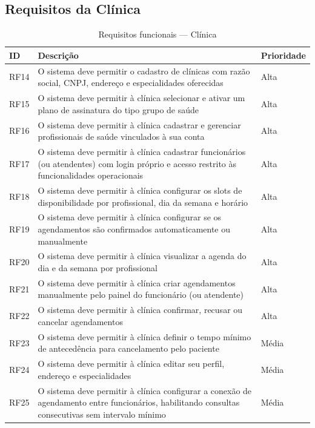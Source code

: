 \subsection{Requisitos da Clínica}
\label{subsec:clinic-requirements}

\begin{table}[H]
  \centering
  \caption{Requisitos funcionais --- Clínica}
  \label{tab:clinic-requirements}
  \begin{tabular}{p{1.2cm}p{7cm}p{2cm}}
    \toprule
    \textbf{ID} &
    \textbf{Descrição} &
    \textbf{Prioridade} \\
    \midrule
    RF14 & O sistema deve permitir o cadastro de
           clínicas com razão social, CNPJ,
           endereço e especialidades oferecidas
         & Alta \\
    RF15 & O sistema deve permitir à clínica
           selecionar e ativar um plano de
           assinatura do tipo grupo de saúde
         & Alta \\
    RF16 & O sistema deve permitir à clínica
           cadastrar e gerenciar profissionais
           de saúde vinculados à sua conta
         & Alta \\
    RF17 & O sistema deve permitir à clínica
           cadastrar funcionários (ou atendentes)
           com login próprio e acesso restrito
           às funcionalidades operacionais
         & Alta \\
    RF18 & O sistema deve permitir à clínica
           configurar os slots de disponibilidade
           por profissional, dia da semana
           e horário
         & Alta \\
    RF19 & O sistema deve permitir à clínica
           configurar se os agendamentos são
           confirmados automaticamente ou
           manualmente
         & Alta \\
    RF20 & O sistema deve permitir à clínica
           visualizar a agenda do dia e da
           semana por profissional
         & Alta \\
    RF21 & O sistema deve permitir à clínica
           criar agendamentos manualmente pelo
           painel do funcionário (ou atendente)
         & Alta \\
    RF22 & O sistema deve permitir à clínica
           confirmar, recusar ou cancelar
           agendamentos
         & Alta \\
    RF23 & O sistema deve permitir à clínica
           definir o tempo mínimo de antecedência
           para cancelamento pelo paciente
         & Média \\
    RF24 & O sistema deve permitir à clínica
           editar seu perfil, endereço e
           especialidades
         & Média \\
    RF25 & O sistema deve permitir à clínica
           configurar a conexão de agendamento
           entre funcionários, habilitando
           consultas consecutivas sem intervalo
           mínimo
         & Média \\
    \bottomrule
  \end{tabular}
\end{table}

